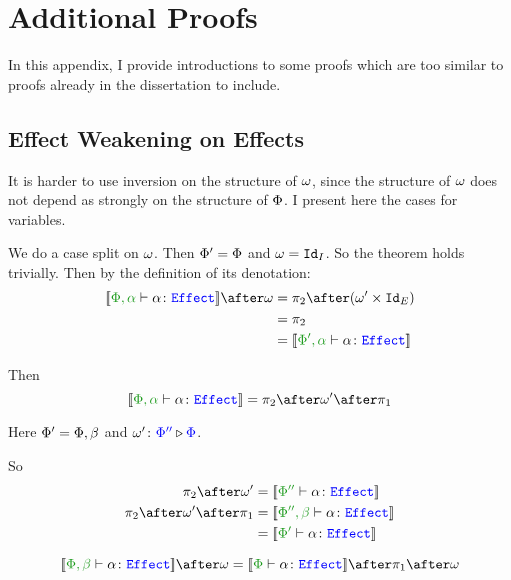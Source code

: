 \chapter{Additional Proofs}\label{WeakeningProofs}

In this appendix, I provide introductions to some proofs which are too similar to proofs already in the dissertation to include.

\section{Effect Weakening on Effects}\label{AppendixEffectWeakeningOnEffects}

It is harder to use inversion on the structure of $\w$, since the structure of $\w$ does not depend as strongly on the structure of $\P$. I present here the cases for variables.
    
        \case{\evar}
        We do a case split on $\w$.
        \subcase{$\w = \i$}
        Then $\P' = \P$ and $\w = \Id{I}$. So the theorem holds trivially.
        Then by the definition of its denotation:    
        \begin{align*}
            \deno{\typerelation{\P,\a}{\a}{\effect}}\after\w &= \pp\after(\w'\times \Id{E}) \\
            & = \pp\\
            & = \deno{\typerelation{\P',\a}{\a}{\effect}}
        \end{align*}
        
        Then \begin{equation}
            \deno{\typerelation{\P,\a}{\a}{\effect}} = \pp\after\w'\after\p
        \end{equation}
        
        Here $\P' = \P,\b$ and $\wrel{\w'}{\P''}{\P}$.
        
        So\begin{align*}
            \pp\after\w' & = \deno{\typerelation{\P''}{\a}{\effect}}
            \\
            \pp\after\w'\after\p & =\deno{\typerelation{\P'',\b}{\a}{\effect}}\\
            &= \deno{\typerelation{\P'}{\a}{\effect}}
        \end{align*}
        
        \case{\eweaken}
        \begin{equation}
            \deno{\typerelation{\P,\b}{\a}{\effect}}\after\w = \deno{\typerelation{\P}{\a}{\effect}}\after\p\after\w
        \end{equation}
        
